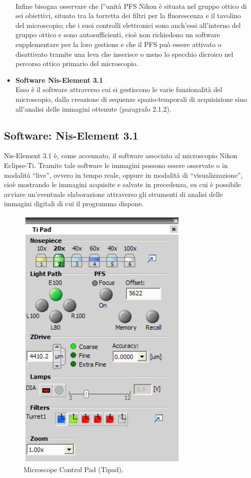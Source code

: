 \begin{itemize}
\\Infine bisogna osservare che l''unità PFS Nikon è situata nel gruppo ottico di sei obiettivi, situato tra la torretta dei filtri per la fluorescenza e il tavolino del microscopio; che i suoi controlli elettronici sono anch'essi all'interno del gruppo ottico e sono autosufficienti, cioè non richiedono un software supplementare per la loro gestione e che il PFS può essere attivato o disattivato tramite una leva che inserisce o meno lo specchio dicroico nel percorso ottico primario del microscopio.

\item \textbf{Software Nis-Element 3.1}\\
Esso è il software attraverso cui si gestiscono le varie funzionalità del microscopio, dalla creazione di sequenze spazio-temporali di acquisizione sino all'analisi delle immagini ottenute (paragrafo 2.1.2).

\end{itemize}

\subsection{Software: Nis-Element 3.1}

Nis-Element 3.1 è, come accennato, il software associato al microscopio Nikon Eclipse-Ti.
Tramite tale software le immagini possono essere osservate o in modalità ``live'', ovvero in tempo reale, oppure in modalità di ``visualizzazione'', cioè mostrando le immagini acquisite e salvate in precedenza, su cui è possibile avviare un'eventuale elaborazione attraverso gli strumenti di analisi delle immagini digitali di cui il programma dispone.

\begin{figure}
 \centering
 \includegraphics[scale=.40]{img/CAP2pannello.png}
 \caption{\small{Microscope Control Pad (Tipad).}}
 \label{fig:pannello}
\end{figure}

